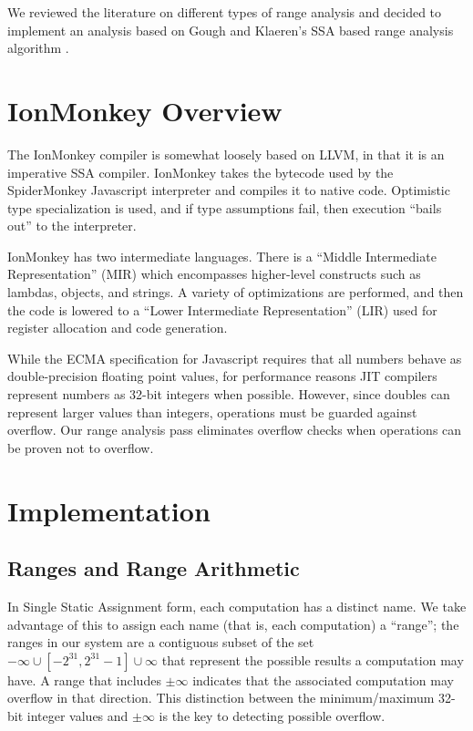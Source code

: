\documentclass{article}
\begin{document}
We reviewed the literature on different types of range analysis and
decided to implement an analysis based on Gough and Klaeren's SSA
based range analysis algorithm \cite{Gough94eliminatingrange}.

\section{IonMonkey Overview}
The IonMonkey compiler is somewhat loosely based on LLVM, in that it is an
imperative SSA compiler. IonMonkey takes the bytecode used by the SpiderMonkey
Javascript interpreter and compiles it to native code. Optimistic type
specialization is used, and if type assumptions fail, then execution ``bails
out'' to the interpreter.

IonMonkey has two intermediate languages. There is a ``Middle
Intermediate Representation'' (MIR) which encompasses higher-level
constructs such as lambdas, objects, and strings. A variety of
optimizations are performed, and then the code is lowered to a ``Lower
Intermediate Representation'' (LIR) used for register allocation and
code generation.

While the ECMA specification for Javascript requires that all numbers behave as
double-precision floating point values, for performance reasons JIT compilers
represent numbers as 32-bit integers when possible. However, since doubles can
represent larger values than integers, operations must be guarded against
overflow.  Our range analysis pass eliminates overflow checks when operations
can be proven not to overflow.

\section{Implementation}

\subsection{Ranges and Range Arithmetic}

In Single Static Assignment form, each computation has a distinct
name. We take advantage of this to assign each name (that is, each
computation) a ``range''; the ranges in our system are a contiguous
subset of the set ${-\infty} \cup [-2^{31}, 2^{31}-1] \cup {\infty}$
that represent the possible results a computation may have. A range
that includes $\pm \infty$ indicates that the associated
computation may overflow in that direction. This distinction between
the minimum/maximum 32-bit integer values and $\pm \infty$ is the key
to detecting possible overflow.
\end{document}
